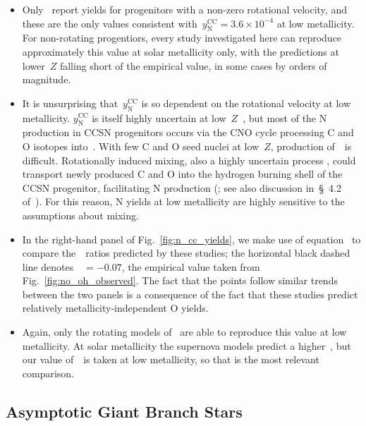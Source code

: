 \documentclass[ms.tex]{subfiles}
\begin{document}
\begin{itemize}
	\item Only~\citet{Limongi2018} report yields for progenitors with a 
	non-zero rotational velocity, and these are the only values consistent 
	with~$y_\text{N}^\text{CC} = 3.6\times10^{-4}$ at low metallicity. 
	For non-rotating progentiors, every study investigated here can reproduce 
	approximately this value at solar metallicity only, with the predictions at 
	lower~$Z$ falling short of the empirical value, in some cases by orders of 
	magnitude. 

	\item It is unsurprising that~$y_\text{N}^\text{CC}$ is so dependent on the 
	rotational velocity at low metallicity. 
	$y_\text{N}^\text{CC}$ is itself highly uncertain at 
	low~$Z$~\citep{Heger2010}, but most of the N production in CCSN progenitors 
	occurs via the CNO cycle processing C and O isotopes into~\Nfourteen. 
	With few C and O seed nuclei at low~$Z$, production of~\Nfourteen~is 
	difficult. 
	Rotationally induced mixing, also a highly uncertain process 
	\citep{Zahn1992, Maeder1998, Lagarde2012}, could transport newly produced 
	C and O into the hydrogen burning shell of the CCSN progenitor, 
	facilitating N production (\citealp{Frischknecht2016}; see also discussion 
	in~\S~4.2 of~\citealp{Andrews2017}). 
	For this reason, N yields at low metallicity are highly sensitive to the 
	assumptions about mixing. 

	\item In the right-hand panel of Fig.~\ref{fig:n_cc_yields}, we make use of 
	equation~ to compare the~\no~ratios predicted by these 
	studies; the horizontal black dashed line denotes~\no\subcc~$= -0.07$, the 
	empirical value taken from Fig.~\ref{fig:no_oh_observed}. 
	The fact that the points follow similar trends between the two panels is a 
	consequence of the fact that these studies predict relatively 
	metallicity-independent O yields. 

	\item Again, only the rotating models of~\citet{Limongi2018} are able to 
	reproduce this value at low metallicity. 
	At solar metallicity the supernova models predict a higher~\no\subcc, but 
	our value of~\no\subcc~is taken at low metallicity, so that is the 
	most relevant comparison. 
\end{itemize} 

\subsection{Asymptotic Giant Branch Stars} 
\label{sec:methods:agb} 
\end{document}
